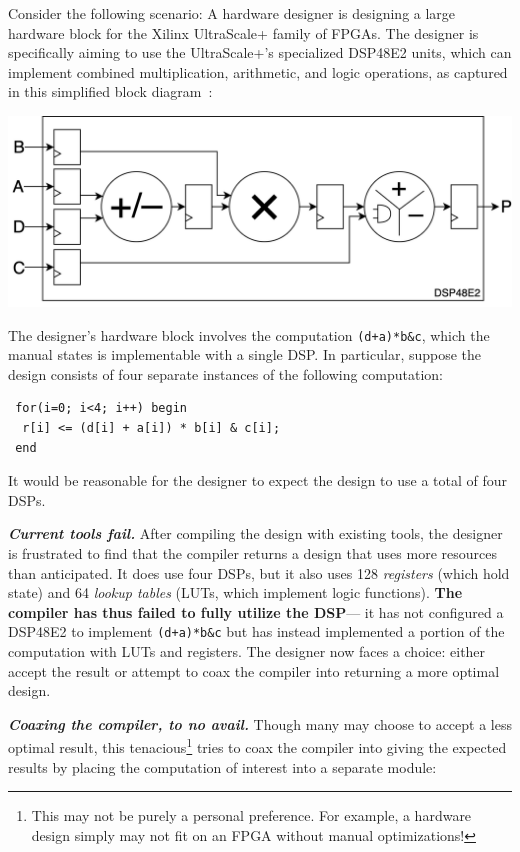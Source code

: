 Consider the following scenario:
A hardware designer
  is designing a large hardware block
  for the Xilinx UltraScale+ family of FPGAs.
The designer is specifically aiming to use 
  the UltraScale+'s specialized DSP48E2 units,
  which 
  can implement 
  combined multiplication, arithmetic,
  and logic operations, as 
  captured in this 
  simplified
  block diagram~\cite{userguide}:
\begin{center}
\includegraphics[width=.75\columnwidth]{assets/dsp48e2-block-diagram-simplified.drawio.png}
\end{center}
The designer's hardware block
  involves the computation
  \texttt{(d+a)*b\&c},
  which the manual states is implementable with a single DSP.
In particular, suppose the design
  consists of four separate instances of the following computation:
\begin{verbatim}
 for(i=0; i<4; i++) begin
  r[i] <= (d[i] + a[i]) * b[i] & c[i];
 end
\end{verbatim}
It would be reasonable for the designer
  to expect the design
  to use a total of four DSPs.

\textit{\textbf{Current tools fail.}}
After compiling the design
  with existing tools,
  the designer is frustrated
  to find that the compiler returns a design
  that uses more
  resources than anticipated.
It does use four DSPs,
  but it also uses 128
  \textit{registers}
  (which hold state)
  and 64 \textit{lookup tables} 
  (LUTs, which implement logic functions).
\textbf{The compiler has thus failed to 
  fully utilize
  the DSP}---%
  it has not configured a DSP48E2
  to implement
  \texttt{(d+a)*b\&c} but has instead
  implemented a portion of the
  computation
  with LUTs and registers.
The designer now faces a choice:
  either accept the result or attempt to coax the compiler
  into returning a more optimal design.

\textit{\textbf{Coaxing the compiler, to no avail.}}
Though many 
may choose to accept a less optimal result,
 this tenacious\footnote{
This may not be purely a personal preference. %
For example, a hardware design simply may not fit on an FPGA
  without manual optimizations!}
  tries to coax
  the compiler into giving the 
  expected results
  by 
  placing the computation
  of interest into a separate module:
  

